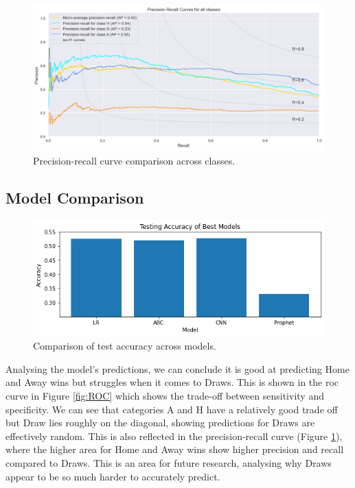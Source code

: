 \documentclass{article}
\begin{document}
\vspace{-1em}
\begin{figure}[!htb]
    \centering
    \includegraphics[width=0.95\linewidth]{Images/Figure 5.jpeg}
    \vspace{-0.9em}
    \caption{Precision-recall curve comparison across classes.}
    \label{fig:precisionrecall}
\end{figure}

\subsection{Model Comparison} 
\label{modelcomparison}

\begin{figure}[!htb]
    \centering
    \includegraphics[width=0.7\linewidth]{Images/Figure 6.png}
    \caption{Comparison of test accuracy across models.}
    \label{fig:models}
\end{figure}

Analysing the model’s predictions, we can conclude it is good at predicting Home and Away wins but struggles when it comes to Draws. This is shown in the \gls{roc} curve in Figure \ref{fig:ROC} which shows the trade-off between sensitivity and specificity. We can see that categories A and H have a relatively good trade off but Draw lies roughly on the diagonal, showing predictions for Draws are effectively random. This is also reflected in the precision-recall curve (Figure \ref{fig:precisionrecall}), where the higher area for Home and Away wins show higher precision and recall compared to Draws. This is an area for future research, analysing why Draws appear to be so much harder to accurately predict. 
\end{document}
